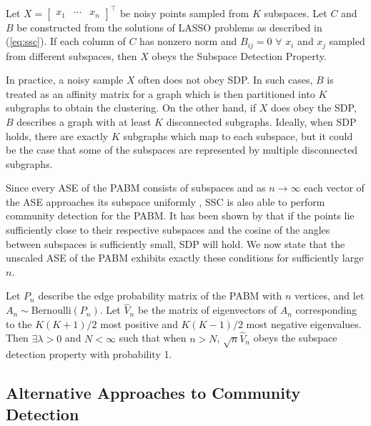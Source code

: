 \documentclass[
  11pt,
]{article}
\begin{document}
\begin{definition} 
Let $X = \begin{bmatrix} x_1 & \cdots & x_n \end{bmatrix}^\top$ be noisy 
points sampled from $K$ subspaces. Let $C$ and $B$ be constructed from the 
solutions of LASSO problems as described in (\ref{eq:ssc}). If each column of 
$C$ has nonzero norm and $B_{ij} = 0$ $\forall$ $x_i$ and $x_j$ sampled from 
different subspaces, then $X$ obeys the Subspace Detection Property. 
\end{definition}

\begin{remark} 
In practice, a noisy sample $X$ often does not obey SDP. 
In such cases, $B$ is treated as an affinity matrix for a graph which 
is then partitioned into $K$ subgraphs to obtain the clustering. On the other 
hand, if $X$ does obey the SDP, $B$ describes a graph 
with at least $K$ disconnected subgraphs. Ideally, when SDP holds, 
there are exactly $K$ subgraphs which map to each subspace, 
but it could be the case that some of the subspaces are represented by 
multiple disconnected subgraphs.
\end{remark}

Since every ASE of the PABM consists of subspaces and as
\(n \to \infty\) each vector of the ASE approaches its subspace
uniformly \cite{rubindelanchy2017statistical}, SSC is also able to
perform community detection for the PABM. It has been shown by
\citet{jmlr-v28-wang13} that if the points lie sufficiently close to
their respective subspaces and the cosine of the angles between
subspaces is sufficiently small, SDP will hold. We now state that the
unscaled ASE of the PABM exhibits exactly these conditions for
sufficiently large \(n\).

\begin{theorem}
\label{theorem5}
Let $P_n$ describe the edge probability matrix of the PABM with 
$n$ vertices, and let $A_n \sim \text{Bernoulli}(P_n)$.  Let $\hat{V}_n$ be the 
matrix of eigenvectors of $A_n$ corresponding to the $K (K + 1) / 2$ most
positive and $K (K - 1) / 2$ most negative eigenvalues. Then 
$\exists \lambda > 0$ and $N < \infty$ such that when $n > N$, 
$\sqrt{n} \hat{V}_n$ obeys the subspace detection property with probability 1.
\end{theorem}

\hypertarget{alternative-approaches-to-community-detection}{%
\subsection{Alternative Approaches to Community
Detection}\label{alternative-approaches-to-community-detection}}
\end{document}
